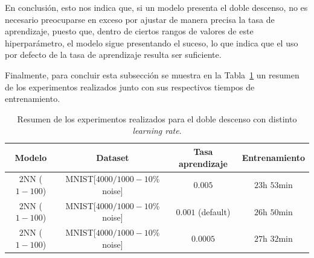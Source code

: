 En conclusión, esto nos indica que, si un modelo presenta el doble descenso, no es necesario preocuparse en exceso por ajustar de manera precisa la tasa de aprendizaje, puesto que, dentro de ciertos rangos de valores de este hiperparámetro, el modelo sigue presentando el suceso, lo que indica que el uso por defecto de la tasa de aprendizaje resulta ser suficiente.

Finalmente, para concluir esta subsección se muestra en la Tabla~\ref{tab:difflr} un resumen de los experimentos realizados junto con sus respectivos tiempos de entrenamiento.

\begin{table}[h!]
    \centering
    \begin{tabular}{|c|c|c|c|}
    \hline
    \textbf{Modelo}       & \textbf{Dataset} & \textbf{Tasa aprendizaje} & \textbf{Entrenamiento} \\ 
    \hline
    $2$NN ($1-100$)     & MNIST[$4000/1000 - 10$\% noise]      & $0.005$      & $23$h $53$min         \\ 
    $2$NN ($1-100$)     & MNIST[$4000/1000 - 10$\% noise]      & $0.001$ (default)      & $26$h $50$min     \\ 
    $2$NN ($1-100$)     & MNIST[$4000/1000 - 10$\% noise]      & $0.0005$      & $27$h $32$min         \\ 
    \hline
    \end{tabular}
    \caption[Resumen de los experimentos realizados para el doble descenso con distinto \textit{learning rate}.]{Resumen de los experimentos realizados para el doble descenso con distinto \textit{learning rate}.}\label{tab:difflr}
\end{table}

\endinput

